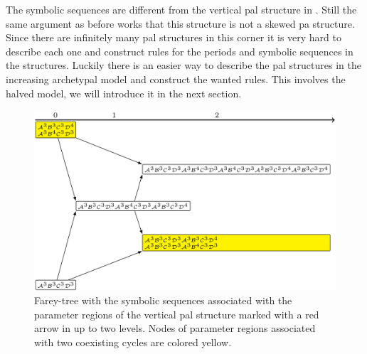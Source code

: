The symbolic sequences are different from the vertical \gls{pal} structure in .
Still the same argument as before works that this structure is not a skewed \gls{pa} structure.
Since there are infinitely many \gls{pal} structures in this corner it is very hard to describe each one and construct rules for the periods and symbolic sequences in the structures.
Luckily there is an easier way to describe the \gls{pal} structures in the increasing archetypal model and construct the wanted rules.
This involves the halved model, we will introduce it in the next section.

\begin{figure}
	\centering
	\includegraphics[width=.7 \textwidth]{../Figures/7/7.15+17/adding.png}
	\caption[Farey-tree with the symbolic sequences of a vertical  structure]{
		Farey-tree with the symbolic sequences associated with the parameter regions of the vertical \gls{pal} structure marked with a red arrow in  up to two levels.
		Nodes of parameter regions associated with two coexisting cycles are colored yellow.
	}
	\label{fig:add.add.like.corn.vert.tree}
\end{figure}
